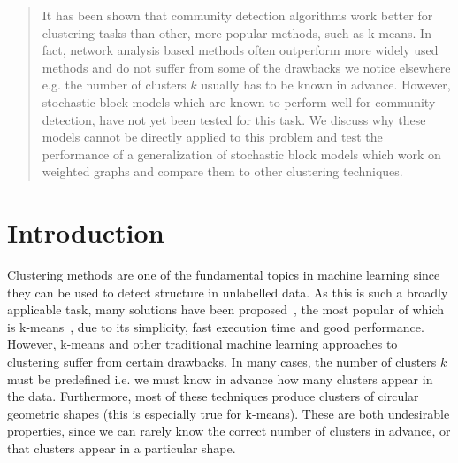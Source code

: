 \documentclass[conference]{IEEEtran}
\begin{document}
\begin{abstract}
It has been shown that community detection algorithms work better for clustering tasks than other, more popular methods, such as k-means. In fact, network analysis based methods often outperform more widely used methods and do not suffer from some of the drawbacks we notice elsewhere e.g. the number of clusters $k$ usually has to be known in advance. However, stochastic block models which are known to perform well for community detection, have not yet been tested for this task. We discuss why these models cannot be directly applied to this problem and test the performance of a generalization of stochastic block models which work on weighted graphs and compare them to other clustering techniques.
\end{abstract}







%
\IEEEpeerreviewmaketitle

\section{Introduction}
Clustering methods are one of the fundamental topics in machine learning since they can be used to detect structure in unlabelled data. As this is such a broadly applicable task, many solutions have been proposed~\cite{theodoridis2003pattern}, the most popular of which is k-means~\cite{macqueen1967some}, due to its simplicity, fast execution time and good performance. However, k-means and other traditional machine learning approaches to clustering suffer from certain drawbacks. In many cases, the number of clusters $k$ must be predefined i.e. we must know in advance how many clusters appear in the data. Furthermore, most of these techniques produce clusters of circular geometric shapes (this is especially true for k-means). These are both undesirable properties, since we can rarely know the correct number of clusters in advance, or that clusters appear in a particular shape.
\end{document}
